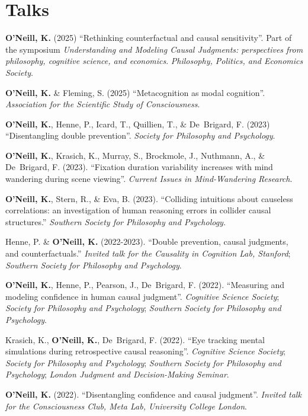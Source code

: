 \section{Talks}

\textbf{O'Neill, K.} (2025) ``Rethinking counterfactual and causal
sensitivity''. Part of the symposium \emph{Understanding and Modeling
Causal Judgments: perspectives from philosophy, cognitive science, and
economics}. \emph{Philosophy, Politics, and Economics Society}.

\textbf{O'Neill, K.} \& Fleming, S. (2025) ``Metacognition as modal
cognition''. \emph{Association for the Scientific Study of
Consciousness}.

\textbf{O'Neill, K.}, Henne, P., Icard, T., Quillien, T., \&
De~Brigard, F. (2023) ``Disentangling double
prevention''. \emph{Society for Philosophy and Psychology}.

\textbf{O'Neill, K.}, Krasich, K., Murray, S., Brockmole, J.,
Nuthmann, A., \& De~Brigard, F. (2023). ``Fixation duration variability
increases with mind wandering during scene viewing''. \emph{Current
Issues in Mind-Wandering Research}.

\textbf{O'Neill, K.}, Stern, R., \& Eva, B. (2023). ``Colliding
intuitions about causeless correlations: an investigation of human
reasoning errors in collider causal structures.'' \emph{Southern
Society for Philosophy and Psychology}.

Henne, P. \& \textbf{O'Neill, K.} (2022-2023). ``Double prevention,
causal judgments, and counterfactuals.'' \emph{Invited talk for the
Causality in Cognition Lab, Stanford}; \emph{Southern Society for
Philosophy and Psychology}.

\textbf{O'Neill, K.}, Henne, P., Pearson, J., De~Brigard,
F. (2022). ``Measuring and modeling confidence in human causal
judgment''. \emph{Cognitive Science Society}; \emph{Society for
Philosophy and Psychology}; \emph{Southern Society for Philosophy and
Psychology}.

Krasich, K., \textbf{O'Neill, K.}, De~Brigard, F. (2022). ``Eye
tracking mental simulations during retrospective causal
reasoning''. \emph{Cognitive Science Society}; \emph{Society for
Philosophy and Psychology}; \emph{Southern Society for Philosophy and
Psychology}; \emph{London Judgment and Decision-Making Seminar}.

\textbf{O'Neill, K.} (2022). ``Disentangling confidence and causal
judgment''. \emph{Invited talk for the Consciousness Club, Meta Lab,
University College London}.

